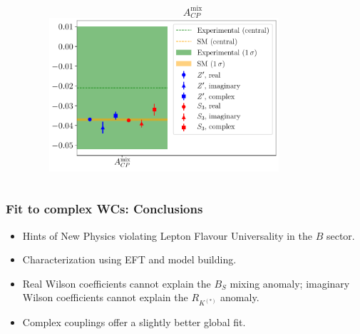\documentclass[mathserif, 10pt, dvipsnames]{beamer}
\begin{document}
\begin{frame}
\begin{figure}
\begin{columns}
\begin{column}{0.48\textwidth}
            \end{column}
            \begin{column}{0.48\textwidth}
                \centering
$$A_{CP}^\mathrm{mix}$$
                \includegraphics[width = 0.8\textwidth]{figures/errorplot_ACPmodels.pdf}
            \end{column}
        \end{columns}
    \end{figure}
\end{frame}

\begin{frame}\frametitle{Fit to complex WCs: Conclusions}
    \begin{itemize}
        \item Hints of New Physics violating Lepton Flavour Universality in the $B$ sector.
        \item Characterization using EFT and model building.
        \item Real Wilson coefficients cannot explain the $B_S$ mixing anomaly; imaginary Wilson coefficients cannot explain the $R_{K^{(*)}}$ anomaly.
        \item Complex couplings offer a slightly better global fit.

    \end{itemize}

\end{frame}
\end{document}
